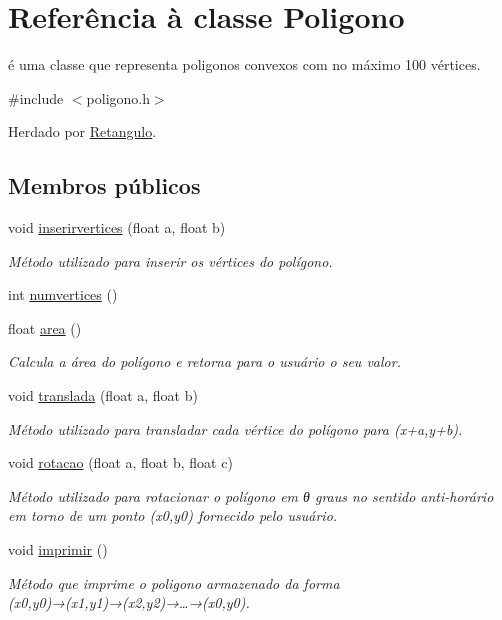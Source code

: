 \hypertarget{class_poligono}{}\section{Referência à classe Poligono}
\label{class_poligono}


é uma classe que representa poligonos convexos com no máximo 100 vértices.  




{\ttfamily \#include $<$poligono.\+h$>$}



Herdado por \mbox{\hyperlink{class_retangulo}{Retangulo}}.

\subsection*{Membros públicos}
\begin{DoxyCompactItemize}
\item 
void \mbox{\hyperlink{class_poligono_ac011b4af1e33ff721421d72f691bd4ad}{inserirvertices}} (float a, float b)
\begin{DoxyCompactList}\small\item\em Método utilizado para inserir os vértices do polígono. \end{DoxyCompactList}\item 
int \mbox{\hyperlink{class_poligono_ac9c6f6a3f13d3f1fb456c15339f3a0c6}{numvertices}} ()
\item 
float \mbox{\hyperlink{class_poligono_a7f66c446f86c19118663ef1b2c8a4be6}{area}} ()
\begin{DoxyCompactList}\small\item\em Calcula a área do polígono e retorna para o usuário o seu valor. \end{DoxyCompactList}\item 
void \mbox{\hyperlink{class_poligono_adbf605dfd0419b7301c9be0ec1dbe41b}{translada}} (float a, float b)
\begin{DoxyCompactList}\small\item\em Método utilizado para transladar cada vértice do polígono para (x+a,y+b). \end{DoxyCompactList}\item 
void \mbox{\hyperlink{class_poligono_a9ddcf14ad55369c3467ef383391673e4}{rotacao}} (float a, float b, float c)
\begin{DoxyCompactList}\small\item\em Método utilizado para rotacionar o polígono em θ graus no sentido anti-\/horário em torno de um ponto (x0,y0) fornecido pelo usuário. \end{DoxyCompactList}\item 
void \mbox{\hyperlink{class_poligono_a754dee9ed6a8fee4eb1a9d0aa0e1707a}{imprimir}} ()
\begin{DoxyCompactList}\small\item\em Método que imprime o poligono armazenado da forma (x0,y0)→(x1,y1)→(x2,y2)→…​→(x0,y0). \end{DoxyCompactList}\end{DoxyCompactItemize}
